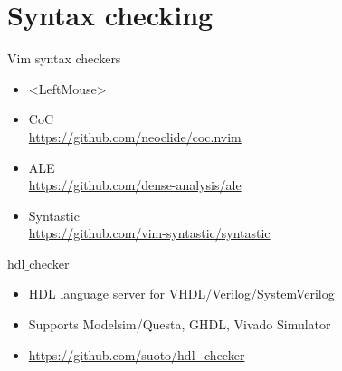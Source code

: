 \documentclass[aspectratio=169]{beamer}
\begin{document}
\section*{Syntax checking}
\begin{frame}{\secname}

  \begin{block}{Vim syntax checkers}
  \begin{itemize}
    \item <LeftMouse>
    \item CoC  \\ \url{https://github.com/neoclide/coc.nvim} 
    \item ALE \\ \url{https://github.com/dense-analysis/ale}
    \item Syntastic \\ \url{https://github.com/vim-syntastic/syntastic}
  \end{itemize}
  \end{block}

  \begin{block}{hdl$\_$checker}
    \begin{itemize}
     \item HDL language server  for VHDL/Verilog/SystemVerilog
     \item Supports Modelsim/Questa, GHDL, Vivado Simulator
     \item \url{https://github.com/suoto/hdl_checker}
    \end{itemize}
    
  \end{block}
    
\end{frame}

\end{document}
